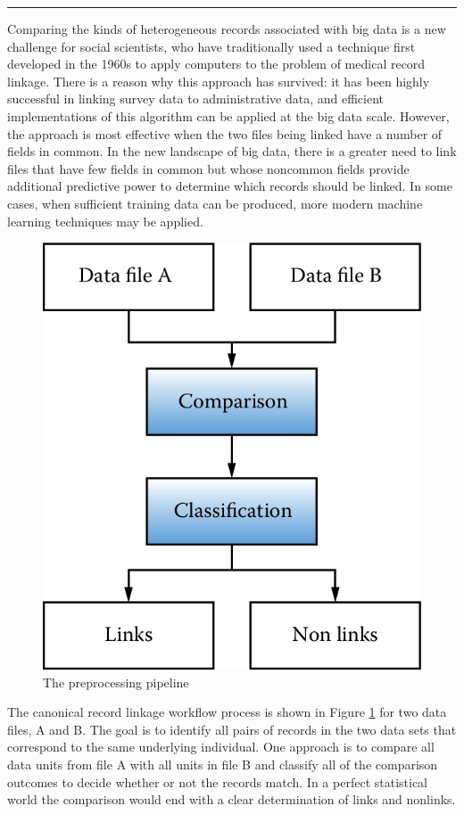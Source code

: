 \documentclass[]{krantz}
\begin{document}
\begin{center}\rule{0.5\linewidth}{\linethickness}\end{center}

Comparing the kinds of heterogeneous records associated with big data is
a new challenge for social scientists, who have traditionally used a
technique first developed in the 1960s to apply computers to the problem
of medical record linkage. There is a reason why this approach has
survived: it has been highly successful in linking survey data to
administrative data, and efficient implementations of this algorithm can
be applied at the big data scale. However, the approach is most
effective when the two files being linked have a number of fields in
common. In the new landscape of big data, there is a greater need to
link files that have few fields in common but whose noncommon fields
provide additional predictive power to determine which records should be
linked. In some cases, when sufficient training data can be produced,
more modern machine learning techniques may be applied.

\begin{figure}

{\centering \includegraphics[width=0.7\linewidth]{ChapterLinkage/figures/fig3-1} 

}

\caption{The preprocessing pipeline}\label{fig:fig3-1}
\end{figure}

The canonical record linkage workflow process is shown in Figure
\ref{fig:fig3-1} for two data files, A and B. The goal is to identify
all pairs of records in the two data sets that correspond to the same
underlying individual. One approach is to compare all data units from
file A with all units in file B and classify all of the comparison
outcomes to decide whether or not the records match. In a perfect
statistical world the comparison would end with a clear determination of
links and nonlinks.
\end{document}
